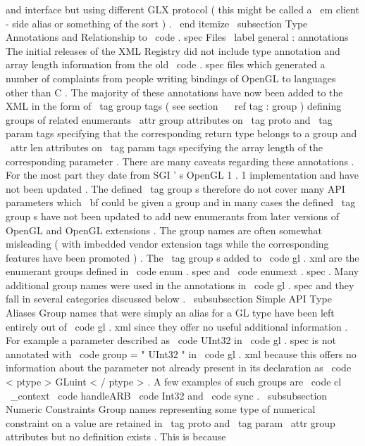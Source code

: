 and
interface
but
using
different
GLX
protocol
(
this
might
be
called
a
{
\
em
client
-
side
alias
}
or
something
of
the
sort
)
.
\
end
{
itemize
}
\
subsection
{
Type
Annotations
and
Relationship
to
\
code
{
.
spec
}
Files
}
\
label
{
general
:
annotations
}
The
initial
releases
of
the
XML
Registry
did
not
include
type
annotation
and
array
length
information
from
the
old
\
code
{
.
spec
}
files
which
generated
a
number
of
complaints
from
people
writing
bindings
of
OpenGL
to
languages
other
than
C
.
The
majority
of
these
annotations
have
now
been
added
to
the
XML
in
the
form
of
\
tag
{
group
}
tags
(
see
section
~
\
ref
{
tag
:
group
}
)
defining
groups
of
related
enumerants
\
attr
{
group
}
attributes
on
\
tag
{
proto
}
and
\
tag
{
param
}
tags
specifying
that
the
corresponding
return
type
belongs
to
a
group
and
\
attr
{
len
}
attributes
on
\
tag
{
param
}
tags
specifying
the
array
length
of
the
corresponding
parameter
.
There
are
many
caveats
regarding
these
annotations
.
For
the
most
part
they
date
from
SGI
'
s
OpenGL
1
.
1
implementation
and
have
not
been
updated
.
The
defined
\
tag
{
group
}
s
therefore
do
not
cover
many
API
parameters
which
{
\
bf
could
}
be
given
a
group
and
in
many
cases
the
defined
\
tag
{
group
}
s
have
not
been
updated
to
add
new
enumerants
from
later
versions
of
OpenGL
and
OpenGL
extensions
.
The
group
names
are
often
somewhat
misleading
(
with
imbedded
vendor
extension
tags
while
the
corresponding
features
have
been
promoted
)
.
The
\
tag
{
group
}
s
added
to
\
code
{
gl
.
xml
}
are
the
enumerant
groups
defined
in
\
code
{
enum
.
spec
}
and
\
code
{
enumext
.
spec
}
.
Many
additional
group
names
were
used
in
the
annotations
in
\
code
{
gl
.
spec
}
and
they
fall
in
several
categories
discussed
below
.
\
subsubsection
{
Simple
API
Type
Aliases
}
Group
names
that
were
simply
an
alias
for
a
GL
type
have
been
left
entirely
out
of
\
code
{
gl
.
xml
}
since
they
offer
no
useful
additional
information
.
For
example
a
parameter
described
as
\
code
{
UInt32
}
in
\
code
{
gl
.
spec
}
is
not
annotated
with
\
code
{
group
=
"
UInt32
"
}
in
\
code
{
gl
.
xml
}
because
this
offers
no
information
about
the
parameter
not
already
present
in
its
declaration
as
\
code
{
<
ptype
>
GLuint
<
/
ptype
>
}
.
A
few
examples
of
such
groups
are
\
code
{
cl
\
_context
}
\
code
{
handleARB
}
\
code
{
Int32
}
and
\
code
{
sync
}
.
\
subsubsection
{
Numeric
Constraints
}
Group
names
representing
some
type
of
numerical
constraint
on
a
value
are
retained
in
\
tag
{
proto
}
and
\
tag
{
param
}
\
attr
{
group
}
attributes
but
no
definition
exists
.
This
is
because

